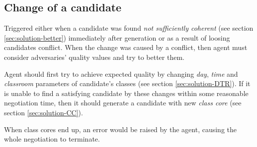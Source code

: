 \documentclass[../../header]{subfiles}
\begin{document}

\subsection{Change of a candidate}
\label{sec:solution-change}

Triggered either when a candidate was found \emph{not sufficiently coherent}
(see section \ref{sec:solution-better}) immediately after generation
or as a result of loosing candidates conflict.
When the change was caused by a conflict, then agent must consider adversaries'
quality values and try to better them.

Agent should first try to achieve expected quality by changing
\emph{day}, \emph{time} and \emph{classroom} parameters of candidate's classes
(see section \ref{sec:solution-DTR}).
If it is unable to find a satisfying candidate by these changes within some
reasonable negotiation time, then it should generate a candidate with new
\emph{class core} (see section \ref{sec:solution-CC}).

When class cores end up, an error would be raised by the agent, causing the whole
negotiation to terminate.

\end{document}
